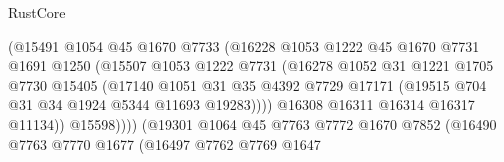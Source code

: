 \begin{lexlean}{RustCore}
\begin{coremodule}
                                        (@15491
                                          @1054
                                          @45
                                          @1670
                                          @7733
                                          (@16228
                                            @1053
                                            @1222
                                            @45
                                            @1670
                                            @7731
                                            @1691
                                            @1250
                                            (@15507
                                              @1053
                                              @1222
                                              @7731
                                              (@16278
                                                @1052
                                                @31
                                                @1221
                                                @1705
                                                @7730
                                                @15405
                                                (@17140
                                                  @1051
                                                  @31
                                                  @35
                                                  @4392
                                                  @7729
                                                  @17171
                                                  (@19515 @704 @31 @34 @1924 @5344 @11693 @19283))))
                                            @16308
                                            @16311
                                            @16314
                                            @16317
                                            @11134))
                                        @15598))))
                                (@19301
                                  @1064
                                  @45
                                  @7763
                                  @7772
                                  @1670
                                  @7852
                                  (@16490
                                    @7763
                                    @7770
                                    @1677
                                    (@16497
                                      @7762
                                      @7769
                                      @1647

\end{coremodule}
\end{lexlean}
